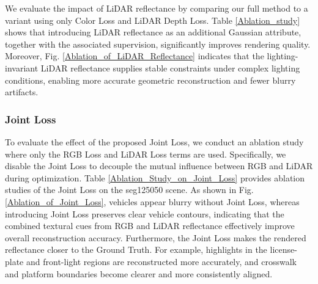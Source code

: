 \documentclass[letterpaper, 10 pt, conference]{ieeeconf}  %
\begin{document}
We evaluate the impact of LiDAR reflectance by comparing our full method to a variant using only Color Loss and LiDAR Depth Loss. Table \ref{Ablation_study} shows that introducing LiDAR reflectance as an additional Gaussian attribute, together with the associated supervision, significantly improves rendering quality. Moreover, Fig. \ref{Ablation_of_LiDAR_Reflectance} indicates that the lighting-invariant LiDAR reflectance supplies stable constraints under complex lighting conditions, enabling more accurate geometric reconstruction and fewer blurry artifacts.


\subsubsection{Joint Loss}

To evaluate the effect of the proposed Joint Loss, we conduct an ablation study where only the RGB Loss and LiDAR Loss terms are used. Specifically, we disable the Joint Loss to decouple the mutual influence between RGB and LiDAR during optimization. Table \ref{Ablation_Study_on_Joint_Loss} provides ablation studies of the Joint Loss on the seg125050 scene. As shown in Fig. \ref{Ablation_of_Joint_Loss}, vehicles appear blurry without Joint Loss, whereas introducing Joint Loss preserves clear vehicle contours, indicating that the combined textural cues from RGB and LiDAR reflectance effectively improve overall reconstruction accuracy. Furthermore, the Joint Loss makes the rendered reflectance closer to the Ground Truth. For example, highlights in the license-plate and front-light regions are reconstructed more accurately, and crosswalk and platform boundaries become clearer and more consistently aligned.
\end{document}
